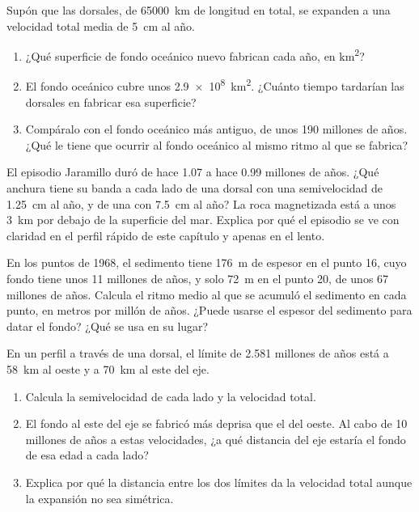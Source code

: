 \begin{exercise}[$\star\star\star$]\label{exo:g11:drift-to-spreading:12}
Supón que las dorsales, de \qty{65000}{km} de longitud en total, se expanden
a una velocidad total media de \qty{5}{cm} al año.
\begin{enumerate}
  \item ¿Qué superficie de fondo oceánico nuevo fabrican cada año, en
        \unit{km^2}?
  \item El fondo oceánico cubre unos \qty{2.9e8}{km^2}. ¿Cuánto tiempo
        tardarían las dorsales en fabricar esa superficie?
  \item Compáralo con el fondo oceánico más antiguo, de unos \num{190}
        millones de años. ¿Qué le tiene que ocurrir al fondo oceánico al
        mismo ritmo al que se fabrica?
\end{enumerate}
\end{exercise}

\begin{exercise}[$\star\star\star$]\label{exo:g11:drift-to-spreading:13}
El episodio Jaramillo duró de hace \num{1.07} a hace \num{0.99} millones de
años. ¿Qué anchura tiene su banda a cada lado de una dorsal con una
semivelocidad de \qty{1.25}{cm} al año, y de una con \qty{7.5}{cm} al año? La
roca magnetizada está a unos \qty{3}{km} por debajo de la superficie del mar.
Explica por qué el episodio se ve con claridad en el perfil rápido de este
capítulo y apenas en el lento.
\end{exercise}

\begin{exercise}[$\star\star\star$]\label{exo:g11:drift-to-spreading:14}
En los puntos de 1968, el sedimento tiene \qty{176}{m} de espesor en el
punto 16, cuyo fondo tiene unos \num{11} millones de años, y solo \qty{72}{m}
en el punto 20, de unos \num{67} millones de años. Calcula el ritmo medio al
que se acumuló el sedimento en cada punto, en metros por millón de años.
¿Puede usarse el espesor del sedimento para datar el fondo? ¿Qué se usa en
su lugar?
\end{exercise}

\begin{exercise}[$\star\star\star$]\label{exo:g11:drift-to-spreading:15}
En un perfil a través de una dorsal, el límite de \num{2.581} millones de
años está a \qty{58}{km} al oeste y a \qty{70}{km} al este del eje.
\begin{enumerate}
  \item Calcula la semivelocidad de cada lado y la velocidad total.
  \item El fondo al este del eje se fabricó más deprisa que el del oeste.
        Al cabo de 10 millones de años a estas velocidades, ¿a qué distancia
        del eje estaría el fondo de esa edad a cada lado?
  \item Explica por qué la distancia entre los dos límites da la velocidad
        total aunque la expansión no sea simétrica.
\end{enumerate}
\end{exercise}

